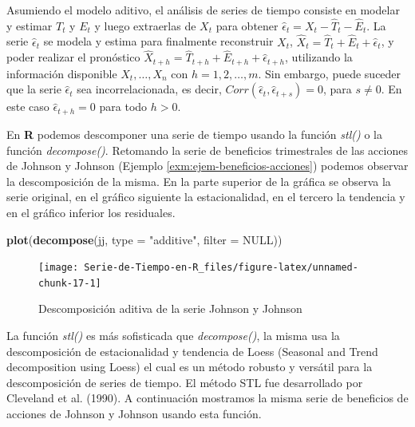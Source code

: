\documentclass[12pt,]{krantz}
\makeatletter
\newenvironment{Shaded}{\begin{snugshade}}{\end{snugshade}}
\newcommand{\KeywordTok}[1]{\textcolor[rgb]{0.13,0.29,0.53}{\textbf{#1}}}
\newcommand{\DataTypeTok}[1]{\textcolor[rgb]{0.13,0.29,0.53}{#1}}
\newcommand{\StringTok}[1]{\textcolor[rgb]{0.31,0.60,0.02}{#1}}
\newcommand{\OtherTok}[1]{\textcolor[rgb]{0.56,0.35,0.01}{#1}}
\newcommand{\NormalTok}[1]{#1}
\newenvironment{kframe}{%
\medskip{}
\setlength{\fboxsep}{.8em}
 \def\at@end@of@kframe{}%
 \ifinner\ifhmode%
  \def\at@end@of@kframe{\end{minipage}}%
  \begin{minipage}{\columnwidth}%
 \fi\fi%
 \def\FrameCommand##1{\hskip\@totalleftmargin \hskip-\fboxsep
 \colorbox{shadecolor}{##1}\hskip-\fboxsep
     \hskip-\linewidth \hskip-\@totalleftmargin \hskip\columnwidth}%
 \MakeFramed {\advance\hsize-\width
   \@totalleftmargin\z@ \linewidth\hsize
   \@setminipage}}%
 {\par\unskip\endMakeFramed%
 \at@end@of@kframe}
\renewenvironment{Shaded}{\begin{kframe}}{\end{kframe}}
\theoremstyle{definition}
\theoremstyle{definition}
\theoremstyle{definition}
\theoremstyle{remark}
\makeatother
\begin{document}
Asumiendo el modelo aditivo, el análisis de series de tiempo consiste en
modelar y estimar \(T_t\) y \(E_t\) y luego extraerlas de \(X_t\) para
obtener \(\hat{\epsilon}_t = X_t - \hat{T}_t - \hat{E}_t\). La serie
\(\hat{\epsilon}_t\) se modela y estima para finalmente reconstruir
\(X_t\), \(\hat{X}_t = \hat{T}_t+\hat{E}_t+\hat{\epsilon}_t\), y poder
realizar el pronóstico
\(\hat{X}_{t+h}=\hat{T}_{t+h}+\hat{E}_{t+h}+\hat{\epsilon}_{t+h}\),
utilizando la información disponible \(X_t,\ldots,X_n\) con
\(h=1,2,\ldots,m\). Sin embargo, puede suceder que la serie
\(\hat{\epsilon}_t\) sea incorrelacionada, es decir,
\(Corr(\hat{\epsilon}_t,\hat{\epsilon}_{t+s}) = 0\), para \(s\neq0\). En
este caso \(\hat{\epsilon}_{t+h}=0\) para todo \(h>0\).

En \textbf{R} podemos descomponer una serie de tiempo usando la función
\emph{stl()} o la función \emph{decompose()}. Retomando la serie de
beneficios trimestrales de las acciones de Johnson y Johnson (Ejemplo
\ref{exm:ejem-beneficios-acciones}) podemos observar la descomposición
de la misma. En la parte superior de la gráfica se observa la serie
original, en el gráfico siguiente la estacionalidad, en el tercero la
tendencia y en el gráfico inferior los residuales.

\begin{Shaded}
\begin{Highlighting}[]
\KeywordTok{plot}\NormalTok{(}\KeywordTok{decompose}\NormalTok{(jj, }\DataTypeTok{type =} \StringTok{"additive"}\NormalTok{, }\DataTypeTok{filter =} \OtherTok{NULL}\NormalTok{))}
\end{Highlighting}
\end{Shaded}

\begin{figure}

{\centering \texttt{[image: Serie-de-Tiempo-en-R\_files/figure-latex/unnamed-chunk-17-1]} 

}

\caption{Descomposición aditiva de la serie Johnson y Johnson}\label{fig:unnamed-chunk-17}
\end{figure}

La función \emph{stl()} es más sofisticada que \emph{decompose()}, la
misma usa la descomposición de estacionalidad y tendencia de Loess
(Seasonal and Trend decomposition using Loess) el cual es un método
robusto y versátil para la descomposición de series de tiempo. El método
STL fue desarrollado por Cleveland et al. (1990). A continuación
mostramos la misma serie de beneficios de acciones de Johnson y Johnson
usando esta función.
\end{document}
